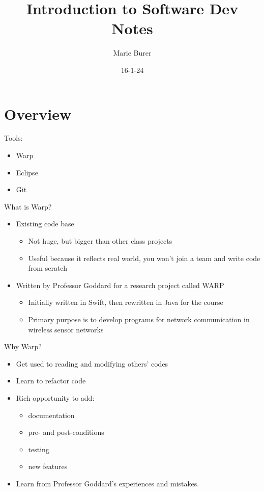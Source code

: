 \documentclass[12pt]{article}
\title{Introduction to Software Dev Notes}
\author{Marie Burer}
\date{16-1-24}
\begin{document}
\maketitle
\newpage

\tableofcontents

\newpage

\section{Overview}

Tools:
\begin{itemize}
    \item Warp
    \item Eclipse
    \item Git
\end{itemize}
What is Warp?

\begin{itemize}
    \item Existing code base
    \begin{itemize}
        \item Not huge, but bigger than other class projects
        \item Useful because it reflects real world, you won't join a team and write code from scratch
    \end{itemize}

    \item Written by Professor Goddard for a research project called WARP
    \begin{itemize}
        \item Initially written in Swift, then rewritten in Java for the course
        \item Primary purpose is to develop programs for network communication in wireless sensor networks
    \end{itemize}
\end{itemize}
Why Warp?

\begin{itemize}
    \item Get used to reading and modifying others' codes
    \item Learn to refactor code
    \item Rich opportunity to add:
    \begin{itemize}
        \item documentation
        \item pre- and post-conditions
        \item testing
        \item new features
    \end{itemize}
    \item Learn from Professor Goddard's experiences and mistakes.
\end{itemize}
\end{document}
